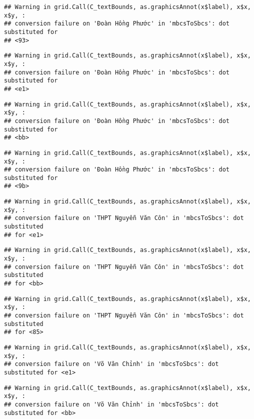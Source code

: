\documentclass[
]{article}
\begin{document}
\begin{verbatim}
## Warning in grid.Call(C_textBounds, as.graphicsAnnot(x$label), x$x, x$y, :
## conversion failure on 'Đoàn Hồng Phước' in 'mbcsToSbcs': dot substituted for
## <93>
\end{verbatim}

\begin{verbatim}
## Warning in grid.Call(C_textBounds, as.graphicsAnnot(x$label), x$x, x$y, :
## conversion failure on 'Đoàn Hồng Phước' in 'mbcsToSbcs': dot substituted for
## <e1>
\end{verbatim}

\begin{verbatim}
## Warning in grid.Call(C_textBounds, as.graphicsAnnot(x$label), x$x, x$y, :
## conversion failure on 'Đoàn Hồng Phước' in 'mbcsToSbcs': dot substituted for
## <bb>
\end{verbatim}

\begin{verbatim}
## Warning in grid.Call(C_textBounds, as.graphicsAnnot(x$label), x$x, x$y, :
## conversion failure on 'Đoàn Hồng Phước' in 'mbcsToSbcs': dot substituted for
## <9b>
\end{verbatim}

\begin{verbatim}
## Warning in grid.Call(C_textBounds, as.graphicsAnnot(x$label), x$x, x$y, :
## conversion failure on 'THPT Nguyễn Văn Côn' in 'mbcsToSbcs': dot substituted
## for <e1>
\end{verbatim}

\begin{verbatim}
## Warning in grid.Call(C_textBounds, as.graphicsAnnot(x$label), x$x, x$y, :
## conversion failure on 'THPT Nguyễn Văn Côn' in 'mbcsToSbcs': dot substituted
## for <bb>
\end{verbatim}

\begin{verbatim}
## Warning in grid.Call(C_textBounds, as.graphicsAnnot(x$label), x$x, x$y, :
## conversion failure on 'THPT Nguyễn Văn Côn' in 'mbcsToSbcs': dot substituted
## for <85>
\end{verbatim}

\begin{verbatim}
## Warning in grid.Call(C_textBounds, as.graphicsAnnot(x$label), x$x, x$y, :
## conversion failure on 'Võ Văn Chỉnh' in 'mbcsToSbcs': dot substituted for <e1>
\end{verbatim}

\begin{verbatim}
## Warning in grid.Call(C_textBounds, as.graphicsAnnot(x$label), x$x, x$y, :
## conversion failure on 'Võ Văn Chỉnh' in 'mbcsToSbcs': dot substituted for <bb>
\end{verbatim}
\end{document}
